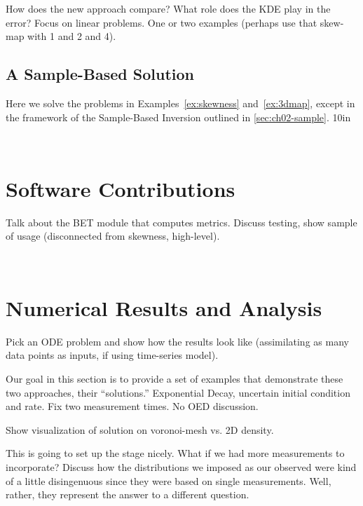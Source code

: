 How does the new approach compare? What role does the KDE play in the error?
Focus on linear problems. One or two examples (perhaps use that skew-map with 1 and 2 and 4).


\subsection{A Sample-Based Solution}\label{eq:sampleskew}

Here we solve the problems in Examples~\ref{ex:skewness} and~\ref{ex:3dmap}, except in the framework of the Sample-Based Inversion outlined in \ref{sec:ch02-sample}.
\vfill{10in}


\
\section{Software Contributions}

Talk about the BET module that computes metrics.
Discuss testing, show sample of usage (disconnected from skewness, high-level).

\
\section{Numerical Results and Analysis}

Pick an ODE problem and show how the results look like (assimilating as many data points as inputs, if using time-series model). 

Our goal in this section is to provide a set of examples that demonstrate these two approaches, their ``solutions.''
Exponential Decay, uncertain initial condition and rate. Fix two measurement times. No OED discussion.

Show visualization of solution on voronoi-mesh vs. 2D density. 

This is going to set up the stage nicely.
What if we had more measurements to incorporate? Discuss how the distributions we imposed as our observed were kind of a little disingenuous since they were based on single measurements. Well, rather, they represent the answer to a different question.

